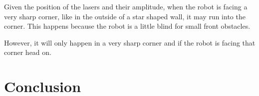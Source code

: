 \documentclass[10pt,journal,compsoc]{IEEEtran}
\begin{document}
Given the position of the lasers and their amplitude, when the robot is facing a very sharp corner, like in the outside of a star shaped wall, it may run into the corner. This happens because the robot is a little blind for small front obstacles.

However, it will only happen in a very sharp corner and if the robot is facing that corner head on.


\section{Conclusion}




\ifCLASSOPTIONcaptionsoff
\newpage
\fi

%
%
\end{document}
